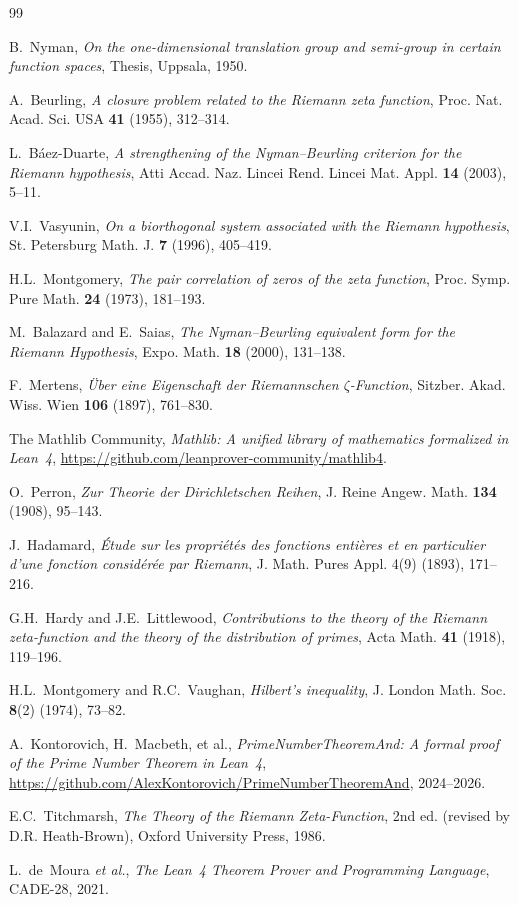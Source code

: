 \documentclass[11pt,a4paper]{article}
\begin{document}
\begin{thebibliography}{99}

B.~Nyman, \emph{On the one-dimensional translation group and semi-group in
certain function spaces}, Thesis, Uppsala, 1950.

A.~Beurling, \emph{A closure problem related to the Riemann zeta function},
Proc. Nat. Acad. Sci. USA \textbf{41} (1955), 312--314.

L.~B\'aez-Duarte, \emph{A strengthening of the Nyman--Beurling criterion for
the Riemann hypothesis}, Atti Accad. Naz. Lincei Rend. Lincei Mat. Appl.
\textbf{14} (2003), 5--11.

V.I.~Vasyunin, \emph{On a biorthogonal system associated with the Riemann
hypothesis}, St. Petersburg Math. J. \textbf{7} (1996), 405--419.

H.L.~Montgomery, \emph{The pair correlation of zeros of the zeta function},
Proc. Symp. Pure Math. \textbf{24} (1973), 181--193.

M.~Balazard and E.~Saias, \emph{The Nyman--Beurling equivalent form for the
Riemann Hypothesis}, Expo. Math. \textbf{18} (2000), 131--138.

F.~Mertens, \emph{\"Uber eine Eigenschaft der Riemannschen $\zeta$-Function},
Sitzber. Akad. Wiss. Wien \textbf{106} (1897), 761--830.

The Mathlib Community, \emph{Mathlib: A unified library of mathematics
formalized in Lean~4}, \url{https://github.com/leanprover-community/mathlib4}.

O.~Perron, \emph{Zur Theorie der Dirichletschen Reihen},
J. Reine Angew. Math. \textbf{134} (1908), 95--143.

J.~Hadamard, \emph{\'Etude sur les propri\'et\'es des fonctions enti\`eres
et en particulier d'une fonction consid\'er\'ee par Riemann},
J. Math. Pures Appl. 4(9) (1893), 171--216.

G.H.~Hardy and J.E.~Littlewood, \emph{Contributions to the theory of the
Riemann zeta-function and the theory of the distribution of primes},
Acta Math. \textbf{41} (1918), 119--196.

H.L.~Montgomery and R.C.~Vaughan, \emph{Hilbert's inequality},
J. London Math. Soc. \textbf{8}(2) (1974), 73--82.

A.~Kontorovich, H.~Macbeth, et al., \emph{PrimeNumberTheoremAnd:
A formal proof of the Prime Number Theorem in Lean~4},
\url{https://github.com/AlexKontorovich/PrimeNumberTheoremAnd}, 2024--2026.

E.C.~Titchmarsh, \emph{The Theory of the Riemann Zeta-Function},
2nd ed. (revised by D.R. Heath-Brown), Oxford University Press, 1986.

L.~de~Moura \emph{et al.}, \emph{The Lean~4 Theorem Prover and Programming
Language}, CADE-28, 2021.

\end{thebibliography}
\end{document}

